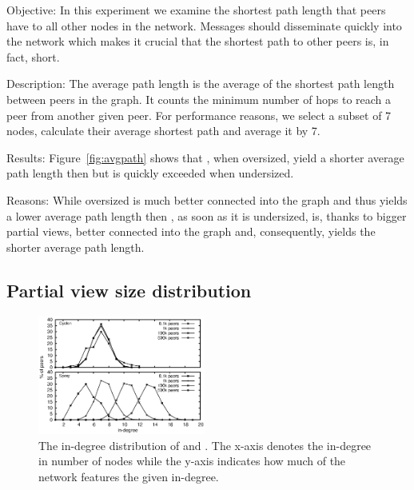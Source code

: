 \begin{asparadesc}
\item[Objective:] In this experiment we examine the shortest path length that
  peers have to all other nodes in the network.  Messages should disseminate
  quickly into the network which makes it crucial that the shortest path to
  other peers is, in fact, short.
\item[Description:] The average path length is the average of the shortest path
  length between peers in the graph. It counts the minimum number of hops to
  reach a peer from another given peer.  For performance reasons, we select a
  subset of 7 nodes, calculate their average shortest path and average it by 7.
\item[Results:] Figure~\ref{fig:avgpath} shows that \CYCLON{}, when oversized,
  yield a shorter average path length then \SPRAY{} but is quickly exceeded
  when undersized.
\item[Reasons:] While oversized \CYCLON{} is much better connected into the
  graph and thus yields a lower average path length then \SPRAY{}, as soon
  as it is undersized, \SPRAY{} is, thanks to bigger partial views, better
  connected into the graph and, consequently, yields the shorter average path
  length. 
\end{asparadesc}

\subsection{Partial view size distribution}
\label{subsec:dist}

\begin{figure}
  \centering
  \includegraphics[width=0.49\textwidth]{img/histo.eps}
  \caption{\label{fig:histo}The in-degree distribution of \CYCLON{} and \SPRAY{}.
  The x-axis denotes the in-degree in number of nodes while the y-axis indicates 
  how much of the network features the given in-degree.}
\end{figure}

